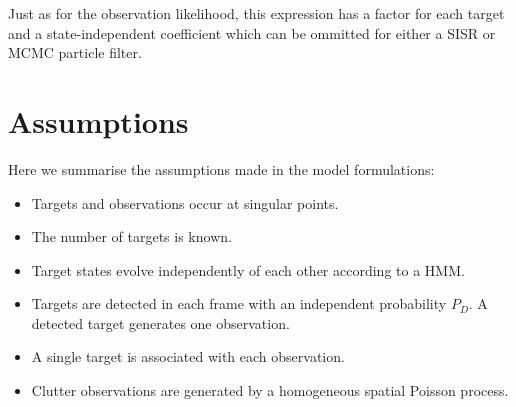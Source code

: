 Just as for the observation likelihood, this expression has a factor for each target and a state-independent coefficient which can be ommitted for either a SISR or MCMC particle filter.



\section{Assumptions}
Here we summarise the assumptions made in the model formulations:

\begin{itemize}
	\item Targets and observations occur at singular points.
	\item The number of targets is known.
	\item Target states evolve independently of each other according to a HMM.
	\item Targets are detected in each frame with an independent probability $P_D$. A detected target generates one observation.
	\item A single target is associated with each observation.
	\item Clutter observations are generated by a homogeneous spatial Poisson process.
\end{itemize}